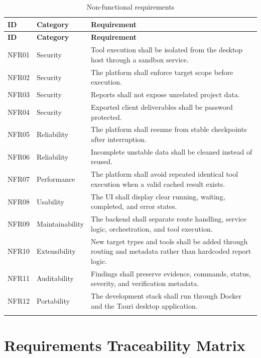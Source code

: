 \documentclass[12pt,a4paper]{report}
\begin{document}
\begin{longtable}{|p{}|p{}|p{}|}
\hline
\textbf{ID} & \textbf{Category} & \textbf{Requirement} \\
\hline
\endfirsthead
\hline
\textbf{ID} & \textbf{Category} & \textbf{Requirement} \\
\hline
\endhead
NFR01 & Security & Tool execution shall be isolated from the desktop host through a
sandbox service. \\
\hline
NFR02 & Security & The platform shall enforce target scope before execution. \\
\hline
NFR03 & Security & Reports shall not expose unrelated project data. \\
\hline
NFR04 & Security & Exported client deliverables shall be password protected. \\
\hline
NFR05 & Reliability & The platform shall resume from stable checkpoints after interruption. \\
\hline
NFR06 & Reliability & Incomplete unstable data shall be cleaned instead of reused. \\
\hline
NFR07 & Performance & The platform shall avoid repeated identical tool execution when a
valid cached result exists. \\
\hline
NFR08 & Usability & The UI shall display clear running, waiting, completed, and error
states. \\
\hline
NFR09 & Maintainability & The backend shall separate route handling, service logic,
orchestration, and tool execution. \\
\hline
NFR10 & Extensibility & New target types and tools shall be added through routing and
metadata rather than hardcoded report logic. \\
\hline
NFR11 & Auditability & Findings shall preserve evidence, commands, status, severity, and
verification metadata. \\
\hline
NFR12 & Portability & The development stack shall run through Docker and the Tauri desktop
application. \\
\hline
\caption{Non-functional requirements}
\label{tab:nonfunctional_requirements}
\end{longtable}

\newpage
\section{Requirements Traceability Matrix}
\end{document}
